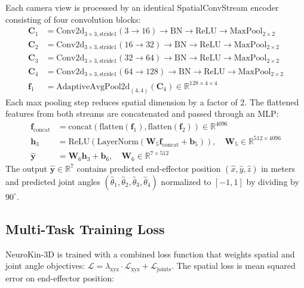 \documentclass[12pt,a4paper,oneside]{report}
\begin{document}
Each camera view is processed by an identical SpatialConvStream encoder consisting of four convolution blocks:
\begin{align}
\mathbf{C}_1 &= \text{Conv2d}_{3\times3,\text{stride}1}(3 \rightarrow 16) \rightarrow \text{BN} \rightarrow \text{ReLU} \rightarrow \text{MaxPool}_{2\times2} \\
\mathbf{C}_2 &= \text{Conv2d}_{3\times3,\text{stride}1}(16 \rightarrow 32) \rightarrow \text{BN} \rightarrow \text{ReLU} \rightarrow \text{MaxPool}_{2\times2} \\
\mathbf{C}_3 &= \text{Conv2d}_{3\times3,\text{stride}1}(32 \rightarrow 64) \rightarrow \text{BN} \rightarrow \text{ReLU} \rightarrow \text{MaxPool}_{2\times2} \\
\mathbf{C}_4 &= \text{Conv2d}_{3\times3,\text{stride}1}(64 \rightarrow 128) \rightarrow \text{BN} \rightarrow \text{ReLU} \rightarrow \text{MaxPool}_{2\times2} \\
\mathbf{f}_1 &= \text{AdaptiveAvgPool2d}_{(4,4)}(\mathbf{C}_4) \in \mathbb{R}^{128 \times 4 \times 4}
\end{align}
Each max pooling step reduces spatial dimension by a factor of 2. The flattened features from both streams are concatenated and passed through an MLP:
\begin{align}
\mathbf{f}_{\text{concat}} &= \text{concat}(\text{flatten}(\mathbf{f}_1), \text{flatten}(\mathbf{f}_2)) \in \mathbb{R}^{4096} \\
\mathbf{h}_3 &= \text{ReLU}(\text{LayerNorm}(\mathbf{W}_5 \mathbf{f}_{\text{concat}} + \mathbf{b}_5)), \quad \mathbf{W}_5 \in \mathbb{R}^{512 \times 4096} \\
\hat{\mathbf{y}} &= \mathbf{W}_6 \mathbf{h}_3 + \mathbf{b}_6, \quad \mathbf{W}_6 \in \mathbb{R}^{7 \times 512}
\end{align}
The output $\hat{\mathbf{y}} \in \mathbb{R}^7$ contains predicted end-effector position $(\hat{x}, \hat{y}, \hat{z})$ in meters and predicted joint angles $(\hat{\theta}_1, \hat{\theta}_2, \hat{\theta}_3, \hat{\theta}_4)$ normalized to $[-1, 1]$ by dividing by $90^\circ$.

\subsection{Multi-Task Training Loss}
\label{subsec:multi_task_training_loss}

NeuroKin-3D is trained with a combined loss function that weights spatial and joint angle objectives: $\mathcal{L} = \lambda_{\text{xyz}} \cdot \mathcal{L}_{\text{xyz}} + \mathcal{L}_{\text{joints}}$. The spatial loss is mean squared error on end-effector position:
\end{document}
